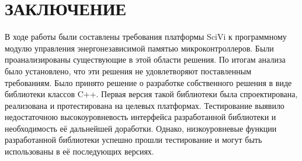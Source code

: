 \chapter*{ЗАКЛЮЧЕНИЕ}

В ходе работы были составлены требования платформы SciVi к программному модулю управления энергонезависимой памятью микроконтроллеров.
Были проанализированы существующие в этой области решения.
По итогам анализа было установлено, что эти решения не удовлетворяют поставленным требованиям.
Было принято решение о разработке собственного решения в виде библиотеки классов C++.
Первая версия такой библиотеки была спроектирована, реализована и протестирована на целевых платформах.
Тестирование выявило недостаточною высокоуровневость интерфейса разработанной библиотеки и необходимость её дальнейшей доработки.
Однако, низкоуровневые функции разработанной библиотеки успешно прошли тестирование и могут быть использованы в её последующих версиях.